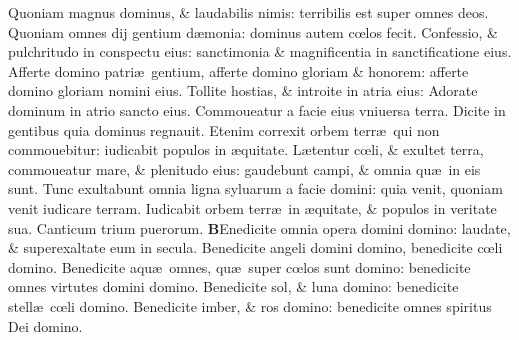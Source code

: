 \documentclass[a5paper,10pt]{book}
\def\rightmarginnote{%
	\lrmarginnote{\hskip\columnwidth \hskip -1em}}
\def\ae{æ}
\def\oe{œ}
\begin{document}
\begin{multicols*}{2}
\newline \color{red} Q\color{black}uoniam magnus dominus, \& laudabilis nimis: terribilis est super omnes deos.
\newline \color{red} Q\color{black}uoniam omnes dij gentium d\ae monia: dominus autem c\oe los fecit.
\newline \color{red} C\color{black}onfessio, \& pulchritudo in conspectu eius: sanctimonia \& magnificentia in sanctificatione eius.
\newline \color{red} A\color{black}fferte domino patri\ae \ gentium, afferte domino gloriam \& honorem: afferte domino gloriam nomini eius.
\newline \color{red} T\color{black}ollite hostias, \& introite in atria eius: Adorate dominum in atrio sancto eius.
\newline \color{red} C\color{black}ommoueatur a facie eius vniuersa terra. Dicite in gentibus quia dominus regnauit.
\newline \color{red} E\color{black}tenim correxit orbem terr\ae \ qui non commouebitur: iudicabit populos in \ae quitate.
\newline \color{red} L\color{black}\ae tentur c\oe li, \& exultet terra, commoueatur mare, \& plenitudo eius: gaudebunt campi, \& omnia qu\ae \ in eis sunt.
\newline \color{red} T\color{black}unc exultabunt omnia ligna syluarum a facie domini: quia venit, quoniam venit iudicare terram.
\newline \color{red} I\color{black}udicabit orbem terr\ae \ in \ae quitate, \& populos in veritate sua.
\newline \color{red} \hypertarget{benedicite}{Canticum} trium puerorum. \color{black}
\vspace{-1em}
\lettrine[lines=2]{\bfseries \color{red} B}{}Enedicite\rightmarginnote{Dan.\\3.} omnia opera domini domino: laudate, \& superexaltate eum in secula.
\newline \color{red} B\color{black}enedicite angeli domini domino, benedicite c\oe li domino.
\newline \color{red} B\color{black}enedicite aqu\ae \ omnes, qu\ae \ super c\oe los sunt domino: benedicite omnes virtutes domini domino.
\newline \color{red} B\color{black}enedicite sol, \& luna domino: benedicite stell\ae \ c\oe li domino.
\newline \color{red} B\color{black}enedicite imber, \& ros domino: benedicite omnes spiritus Dei domino.

\end{multicols*}
\end{document}
